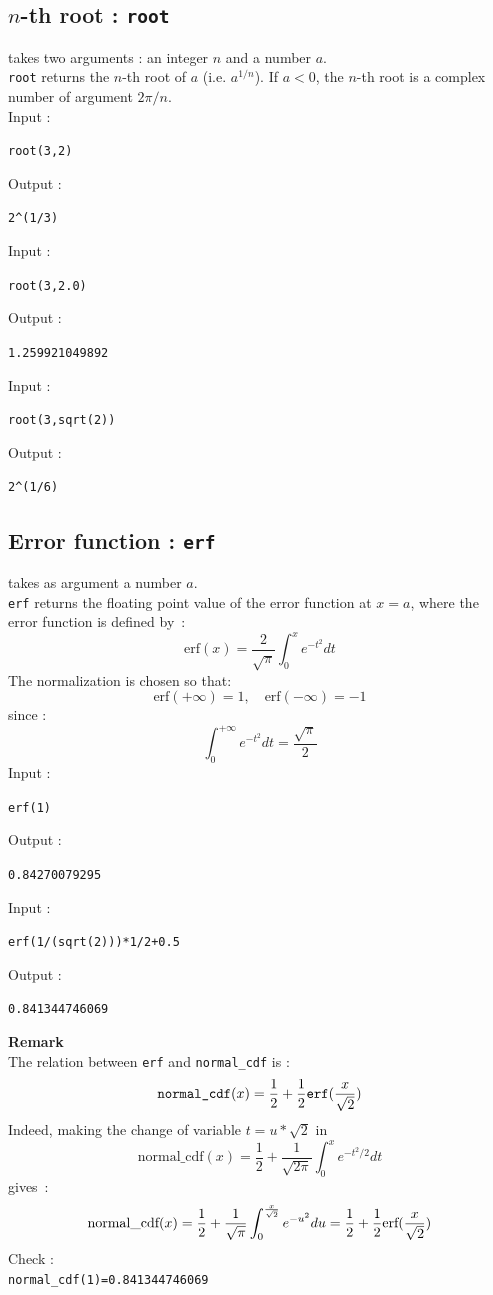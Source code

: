 \documentclass[a4paper,11pt]{book}
\begin{document}
\subsection{$n$-th root : {\tt root}}
 takes two arguments : an integer $n$ and a number $a$.\\
{\tt root} returns the $n$-th root of $a$ (i.e. $a^{1/n}$).
If $a<0$, the $n$-th root is a complex number of argument $2\pi/n$.\\
Input :
\begin{center}{\tt root(3,2)}\end{center}
Output :
\begin{center}{\tt 2\verb|^|(1/3)}\end{center}
\noindent Input :
\begin{center}{\tt root(3,2.0)}\end{center}
Output :
\begin{center}{\tt 1.259921049892}\end{center}
Input :
\begin{center}{\tt root(3,sqrt(2))}\end{center}
Output :
\begin{center}{\tt 2\verb|^|(1/6)}\end{center}

\subsection{Error function : {\tt erf}}
 takes as argument a number $a$.\\
{\tt erf} returns the floating point value of the error function at $x=a$, 
where the error function is defined by~:
\[ \mbox{erf}(x)=\frac{2}{\sqrt{\pi}}\int_0^{x}e^{-t^2}dt \]
The normalization is chosen so that: 
\[ \mbox{erf}(+\infty)=1, \quad  \mbox{erf}(-\infty)=-1 \]
since :
\[ \int_0^{+\infty}e^{-t^2}dt=\frac{\sqrt{\pi}}{2} \]
Input :
\begin{center}{\tt erf(1)}\end{center}
Output :
\begin{center}{\tt 0.84270079295}\end{center}
Input :
\begin{center}{\tt erf(1/(sqrt(2)))*1/2+0.5}\end{center}
Output :
\begin{center}{\tt 0.841344746069}\end{center}
{\bf Remark}\\
The relation between {\tt erf} and {\tt normal\_cdf} is :\\
\[ \mbox{\tt normal\_cdf}(x)=\frac{1}{2}+\frac{1}{2}\*\mbox{\tt
  erf}(\frac{x}{\sqrt{2}}) \]
Indeed, making the change of variable $t=u*\sqrt{2}$ in 
\[ \mbox{normal\_cdf}(x)=\frac{1}{2}+\frac{1}{\sqrt{2\pi}}\int_0^{x}e^{-t^2/2}dt\]
gives~:
\[ \mbox{normal\_cdf}(x)=\frac{1}{2}+\frac{1}{\sqrt{\pi}}\int_0^{\frac{x}{\sqrt{2}}}e^{-u^2}du=\frac{1}{2}+\frac{1}{2}\*\mbox{erf}(\frac{x}{\sqrt{2}})\]
Check :\\
{\tt normal\_cdf(1)=0.841344746069}
\end{document}
